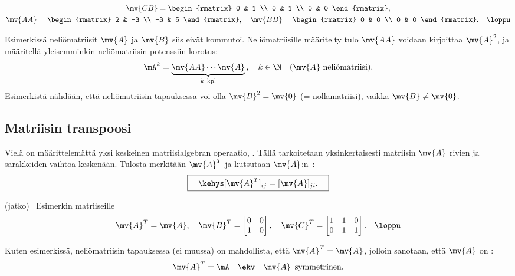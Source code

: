 \begin{Exa}
\begin{gather*}
\mv{CB} = \begin{rmatrix} 0 & 1 \\ 0 & 1 \\ 0 & 0 \end{rmatrix}, \\
\mv{AA} = \begin{rmatrix} 2 & -3 \\ -3 & 5 \end{rmatrix}, \quad 
\mv{BB} = \begin{rmatrix} 0 & 0 \\ 0 & 0 \end{rmatrix}. \quad \loppu
\end{gather*}                            
\end{Exa}

Esimerkissä neliömatriisit $\mv{A}$ ja $\mv{B}$ siis eivät kommutoi. Neliömatriisille määritelty
tulo $\mv{AA}$ voidaan kirjoittaa  $\mv{A}^2$, ja määritellä yleisemminkin neliömatriisin 
potenssiin korotus:
\[ 
\mA^k = \underbrace{\mv{AA} \cdots \mv{A}}_{k\ \text{kpl}}\,, \quad 
                         k \in \N \quad (\text{$\mv{A}$ neliömatriisi}). 
\]
Esimerkistä nähdään, että neliömatriisin tapauksessa voi olla $\mv{B}^2 = \mv{0}$ 
(= nollamatriisi), vaikka $\mv{B} \neq \mv{0}$.

\subsection{Matriisin transpoosi}

Vielä on määrittelemättä yksi keskeinen matriisialgebran operaatio,
%
. Tällä tarkoitetaan yksinkertaisesti matriisin $\mv{A}$ rivien ja
sarakkeiden vaihtoa keskenään. Tulosta merkitään $\mv{A}^T$ ja kutsutaan $\mv{A}$:n
\,:
\[ 
\boxed{ \quad \kehys [\mv{A}^T]_{ij} = [\mv{A}]_{ji}. \quad } 
\]
\jatko \begin{Exa} (jatko) \ Esimerkin matriiseille
\[ 
\mv{A}^T = \mv{A}, \quad \mv{B}^T = \begin{bmatrix} 0 & 0 \\ 1 & 0 \end{bmatrix}, \quad
\mv{C}^T = \begin{bmatrix} 1 & 1 & 0 \\ 0 & 1 & 1 \end{bmatrix}. \quad \loppu
\] 
\end{Exa}
Kuten esimerkissä, neliömatriisin tapauksessa (ei muussa) on mahdollista, että 
$\mv{A}^T = \mv{A}$, jolloin sanotaan, että $\mv{A}$ on :
\[ 
\mv{A}^T = \mA \quad \ekv \quad \mv{A}\,\ \text{symmetrinen}. 
\]

